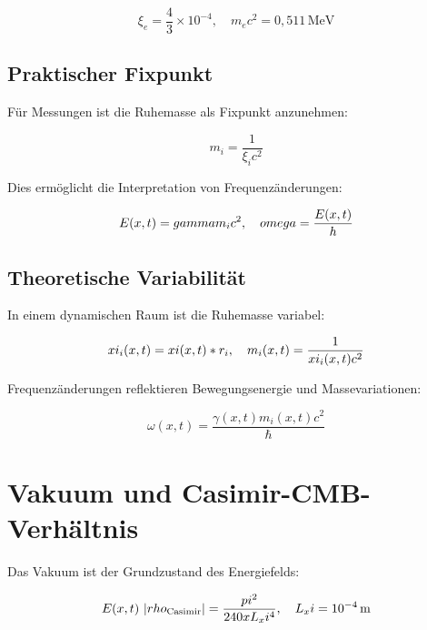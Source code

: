 \documentclass[12pt,a4paper]{report}
\begin{document}
\begin{equation}
	\xi_e = \frac{4}{3} \times 10^{-4}, \quad m_e c^2 = 0{,}511 \, \text{MeV}
	\label{eq:elektron_energie}
\end{equation}

\subsection{Praktischer Fixpunkt}
\label{subsec:praktischer_fixpunkt}

Für Messungen ist die Ruhemasse als Fixpunkt anzunehmen:

\begin{equation}
	m_i = \frac{1}{\xi_i c^2}
	\label{eq:ruhemasse_fixpunkt}
\end{equation}

Dies ermöglicht die Interpretation von Frequenzänderungen:

\begin{equation}
	E(x,t) = gamma m_i c^2, \quad omega = \frac{E(x,t)}{h}
	\label{eq:frequenz_interpretation}
\end{equation}

\subsection{Theoretische Variabilität}
\label{subsec:theoretische_variabilitaet}

In einem dynamischen Raum ist die Ruhemasse variabel:

\begin{equation}
	xi_i(x,t) = xi(x,t) * r_i, \quad m_i(x,t) = \frac{1}{xi_i(x,t) c^2}
	\label{eq:ruhemasse_variabel}
\end{equation}

Frequenzänderungen reflektieren Bewegungsenergie und Massevariationen:

\begin{equation}
	\omega(x,t) = \frac{\gamma(x,t) m_i(x,t) c^2}{\hbar}
	\label{eq:frequenz_variabel}
\end{equation}

\section{Vakuum und Casimir-CMB-Verhältnis}
\label{sec:vakuum_casimir_cmb}

Das Vakuum ist der Grundzustand des Energiefelds:

\begin{equation}
	E(x,t) ~ |rho_{\text{Casimir}}| = \frac{pi^2}{240 x L_xi^4}, \quad L_xi = 10^{-4} \, \text{m}
	\label{eq:casimir_energie}
\end{equation}
\end{document}
